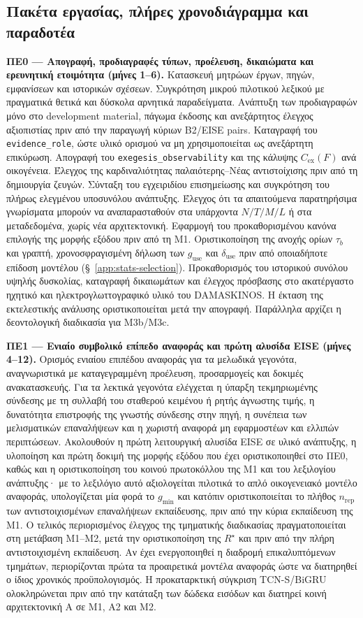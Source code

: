 \documentclass[11pt,a4paper]{article}
\begin{document}
\subsection{Πακέτα εργασίας, πλήρες χρονοδιάγραμμα και παραδοτέα}\label{app:impl-wp}

\textbf{ΠΕ0 --- Απογραφή, προδιαγραφές τύπων, προέλευση, δικαιώματα και ερευνητική ετοιμότητα (μήνες 1--6).} Κατασκευή μητρώων έργων, πηγών, εμφανίσεων και ιστορικών σχέσεων. Συγκρότηση μικρού πιλοτικού λεξικού με πραγματικά θετικά και δύσκολα αρνητικά παραδείγματα. Ανάπτυξη των προδιαγραφών μόνο στο development material, πάγωμα έκδοσης και ανεξάρτητος έλεγχος αξιοπιστίας πριν από την παραγωγή κύριων B2/EISE pairs. Καταγραφή του \texttt{evidence\_role}, ώστε υλικό ορισμού να μη χρησιμοποιείται ως ανεξάρτητη επικύρωση. Απογραφή του \texttt{exegesis\_observability} και της κάλυψης $C_{\mathrm{ex}}(F)$ ανά οικογένεια. Έλεγχος της καρδιναλιότητας παλαιότερης--Νέας αντιστοίχισης πριν από τη δημιουργία ζευγών. Σύνταξη του εγχειριδίου επισημείωσης και συγκρότηση του πλήρως ελεγμένου υποσυνόλου ανάπτυξης. Έλεγχος ότι τα απαιτούμενα παρατηρήσιμα γνωρίσματα μπορούν να αναπαρασταθούν στα υπάρχοντα $N/T/M/L$ ή στα μεταδεδομένα, χωρίς νέα αρχιτεκτονική. Εφαρμογή του προκαθορισμένου κανόνα επιλογής της μορφής εξόδου πριν από τη M1. Οριστικοποίηση της ανοχής ορίων $\tau_b$ και γραπτή, χρονοσφραγισμένη δήλωση των $g_{\mathrm{use}}$ και $\delta_{\mathrm{use}}$ πριν από οποιαδήποτε επίδοση μοντέλου (§~\ref{app:stats-selection}). Προκαθορισμός του ιστορικού συνόλου υψηλής δυσκολίας, καταγραφή δικαιωμάτων και έλεγχος πρόσβασης στο ακατέργαστο ηχητικό και ηλεκτρογλωττογραφικό υλικό του DAMASKINOS. Η έκταση της εκτελεστικής ανάλυσης οριστικοποιείται μετά την απογραφή. Παράλληλα αρχίζει η δεοντολογική διαδικασία για M3b/M3c.

\textbf{ΠΕ1 --- Ενιαίο συμβολικό επίπεδο αναφοράς και πρώτη αλυσίδα EISE (μήνες 4--12).} Ορισμός ενιαίου επιπέδου αναφοράς για τα μελωδικά γεγονότα, αναγνωριστικά με καταγεγραμμένη προέλευση, προσαρμογείς και δοκιμές ανακατασκευής. Για τα λεκτικά γεγονότα ελέγχεται η ύπαρξη τεκμηριωμένης σύνδεσης με τη συλλαβή του σταθερού κειμένου ή ρητής άγνωστης τιμής, η δυνατότητα επιστροφής της γνωστής σύνδεσης στην πηγή, η συνέπεια των μελισματικών επαναλήψεων και η χωριστή αναφορά μη εφαρμοστέων και ελλιπών περιπτώσεων. Ακολουθούν η πρώτη λειτουργική αλυσίδα EISE σε υλικό ανάπτυξης, η υλοποίηση και πρώτη δοκιμή της μορφής εξόδου που έχει οριστικοποιηθεί στο ΠΕ0, καθώς και η οριστικοποίηση του κοινού πρωτοκόλλου της M1 και του λεξιλογίου ανάπτυξης· με το λεξιλόγιο αυτό αξιολογείται πιλοτικά το απλό οικογενειακό μοντέλο αναφοράς, υπολογίζεται μία φορά το $g_{\min}$ και κατόπιν οριστικοποιείται το πλήθος $n_{\mathrm{rep}}$ των αντιστοιχισμένων επαναλήψεων εκπαίδευσης, πριν από την κύρια εκπαίδευση της M1. Ο τελικός περιορισμένος έλεγχος της τμηματικής διαδικασίας πραγματοποιείται στη μετάβαση M1--M2, μετά την οριστικοποίηση της $R^\star$ και πριν από την πλήρη αντιστοιχισμένη εκπαίδευση. Αν έχει ενεργοποιηθεί η διαδρομή επικαλυπτόμενων τμημάτων, περιορίζονται πρώτα τα προαιρετικά μοντέλα αναφοράς ώστε να διατηρηθεί ο ίδιος χρονικός προϋπολογισμός. Η προκαταρκτική σύγκριση TCN-S/BiGRU ολοκληρώνεται πριν από την κατάταξη των δώδεκα εισόδων και διατηρεί κοινή αρχιτεκτονική Α σε Μ1, Α2 και Μ2.
\end{document}
